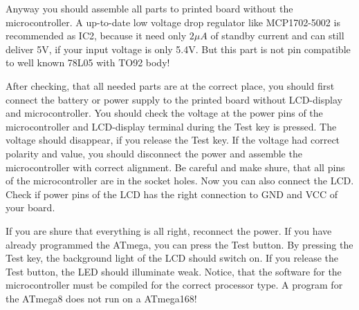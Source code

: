 Anyway you should assemble all parts to printed board without the microcontroller.
A up-to-date low voltage drop regulator like MCP1702-5002 is recommended as IC2, because it
need only \(2\mu A\) of standby current and can still deliver 5V, if your input
voltage is only 5.4V. But this part is not pin compatible to well known 78L05 with TO92 body!

After checking, that all needed parts are at the correct place, you should
first connect the battery or power supply to the printed board without LCD-display
and microcontroller. You should check the voltage at the power pins of the
microcontroller and LCD-display terminal during the Test key is pressed.
The voltage should disappear, if you release the Test key.
If the voltage had correct polarity and value,
you should disconnect the power and assemble the microcontroller with correct
alignment. Be careful and make shure, that all pins of the microcontroller
are in the socket holes.
Now you can also connect the LCD. Check if power pins of the LCD has the right connection to
GND and VCC of your board.

If you are shure that everything is all right, reconnect the power. 
If you have already programmed the ATmega, you can press the Test button.
By pressing the Test key, the background light of the LCD should switch on.
If you release the Test button, the LED should illuminate weak.
Notice, that the software for the microcontroller must be compiled for the
correct processor type. A program for the ATmega8 does not run on a ATmega168!

